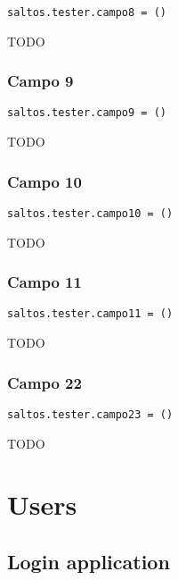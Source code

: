 \documentclass[a4paper]{article}
\begin{document}
\begin{lstlisting}
saltos.tester.campo8 = ()
\end{lstlisting}

TODO

\hypertarget{toc152}{}
\subsubsection{Campo 9}

\begin{lstlisting}
saltos.tester.campo9 = ()
\end{lstlisting}

TODO

\hypertarget{toc153}{}
\subsubsection{Campo 10}

\begin{lstlisting}
saltos.tester.campo10 = ()
\end{lstlisting}

TODO

\hypertarget{toc154}{}
\subsubsection{Campo 11}

\begin{lstlisting}
saltos.tester.campo11 = ()
\end{lstlisting}

TODO

\hypertarget{toc155}{}
\subsubsection{Campo 22}

\begin{lstlisting}
saltos.tester.campo23 = ()
\end{lstlisting}

TODO


\hypertarget{toc156}{}
\section{Users}

\hypertarget{toc157}{}
\subsection{Login application}
\end{document}
